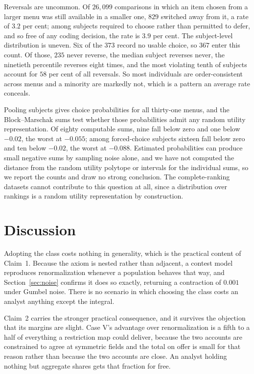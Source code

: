 \documentclass[11pt]{article}
\begin{document}
Reversals are uncommon. Of $26{,}099$ comparisons in which an item chosen from a
larger menu was still available in a smaller one, $829$ switched away from it, a
rate of $3.2$ per cent; among subjects required to choose rather than permitted to
defer, and so free of any coding decision, the rate is $3.9$ per cent. The
subject-level distribution is uneven. Six of the $373$ record no usable choice, so
$367$ enter this count. Of those, $235$ never reverse, the
median subject reverses never, the ninetieth percentile reverses eight times, and
the most violating tenth of subjects account for $58$ per cent of all reversals. So
most individuals are order-consistent across menus and a minority are markedly
not, which is a pattern an average rate conceals.

Pooling subjects gives choice probabilities for all thirty-one menus, and the
Block--Marschak sums test whether those probabilities admit any random utility
representation. Of eighty computable sums, nine fall below zero and one below
$-0.02$, the worst at $-0.055$; among forced-choice subjects sixteen fall below
zero and ten below $-0.02$, the worst at $-0.088$. Estimated probabilities can
produce small negative sums by sampling noise alone, and we have not computed the
distance from the random utility polytope or intervals for the individual sums, so
we report the counts and draw no strong conclusion. The complete-ranking datasets
cannot contribute to this question at all, since a distribution over rankings is a
random utility representation by construction.

\section{Discussion}

Adopting the class costs nothing in generality, which is the practical content of
Claim~1. Because the axiom is nested rather than adjacent, a contest model
reproduces renormalization whenever a population behaves that way, and
Section~\ref{sec:noise} confirms it does so exactly, returning a contraction of
$0.001$ under Gumbel noise. There is no scenario in which choosing the class costs
an analyst anything except the integral.

Claim~2 carries the stronger practical consequence, and it survives the objection
that its margins are slight. Case V's advantage over renormalization is a fifth to a
half of everything a restriction map could deliver, because the two accounts are
constrained to agree at symmetric fields and the total on offer is small for that
reason rather than because the two accounts are close. An analyst holding nothing
but aggregate shares gets that fraction for free.
\end{document}
